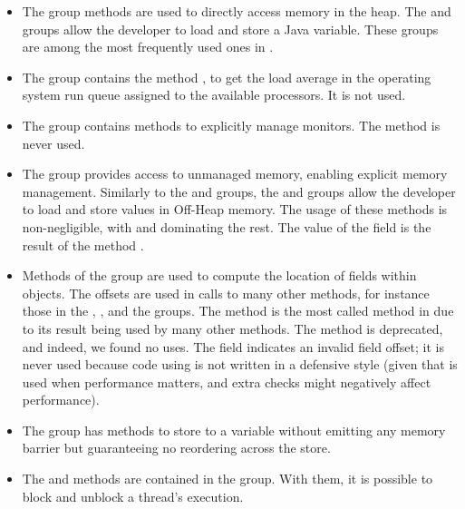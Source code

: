 \begin{itemize}
\item The  group methods are used to directly access memory in the \java{} heap. The  and  groups allow the developer to load and store a Java variable. These groups are among the most frequently used ones in \unsafe{}.

\item The  group contains the method , to get the load average in the operating system run queue assigned to the available processors. It is not used.

\item The  group contains methods to explicitly manage \java{} monitors.
The  method is never used.

\item The  group provides access to unmanaged memory, enabling explicit memory management. Similarly to the  and  groups, the  and  groups allow the developer to load and store values in Off-Heap memory. The usage of these methods is non-negligible, with  and  dominating the rest. The value of the  field is the result of the method .

\item Methods of the  group are used to compute the location of fields within \java{} objects. The offsets are used in calls to many other \smu{} methods, for instance those in the , , and the  groups. The method  is the most called method in \smu{} due to its result being used by many other \smu{} methods. The  method is deprecated, and indeed, we found no uses.
The  field indicates an invalid field offset; it is never used because code using  is not written in a defensive style
(given that \unsafe{} is used when performance matters,
and extra checks might negatively affect performance).

\item The  group has methods to store to a \java{} variable without emitting any memory barrier but guaranteeing no reordering across the store.

\item The  and  methods are contained in the  group. With them, it is possible to block and unblock a thread's execution.


\end{itemize}

